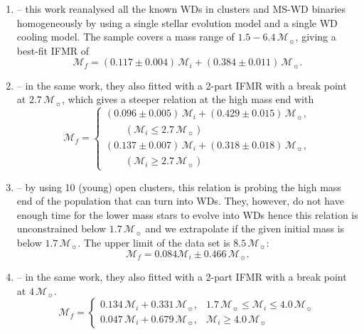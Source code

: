 \documentclass[fleqn,usenatbib]{rasti}
\newcommand{\msun}{\mathcal{M}_{\sun}}
\begin{document}
\begin{enumerate}
    \item \citet{2008MNRAS.387.1693C} -- this work reanalysed all the known WDs in clusters and MS-WD binaries homogeneously by using a single stellar evolution model and a single WD cooling model. The sample covers a mass range of $1.5-6.4\,\msun$, giving a best-fit IFMR of
    \begin{equation}
        \mathcal{M}_f = (0.117 \pm 0.004)\,\mathcal{M}_i + (0.384 \pm 0.011)\,\msun.
    \end{equation}
    \item \citet[][two-part]{2008MNRAS.387.1693C} -- in the same work, they also fitted with a 2-part IFMR with a break point at $2.7\,\msun$, which gives a steeper relation at the high mass end with
    \begin{equation}
        \mathcal{M}_f = \begin{cases}
                  (0.096 \pm 0.005)\,\mathcal{M}_i + (0.429 \pm 0.015)\,\msun,\\
                  \qquad(\mathcal{M}_i \leq 2.7\,\msun)\\
                  (0.137 \pm 0.007)\,\mathcal{M}_i + (0.318 \pm 0.018)\,\msun,\\
                  \qquad(\mathcal{M}_i \geq 2.7\,\msun)
              \end{cases}
    \end{equation}
    \item \citet{2009ApJ...692.1013S} -- by using 10 (young) open clusters, this relation is probing the high mass end of the population that can turn into WDs. They, however, do not have enough time for the lower mass stars to evolve into WDs hence this relation is unconstrained below $1.7\,\msun$ and we extrapolate if the given initial mass is below $1.7\,\msun$. The upper limit of the data set is $8.5\,\msun$:
    \begin{equation}
        \mathcal{M}_f = 0.084 \mathcal{M}_i \pm 0.466\,\msun.
    \end{equation}
    \item \citet[][two-part]{2009ApJ...692.1013S} -- in the same work, they also fitted with a 2-part IFMR with a break point at $4\,\msun$.
    \begin{equation}
        \mathcal{M}_f = \begin{cases}
                  0.134\,\mathcal{M}_i + 0.331\,\msun, &1.7\,\msun \leq \mathcal{M}_i \leq 4.0\,\msun\\
                  0.047\,\mathcal{M}_i + 0.679\,\msun, &\mathcal{M}_i \geq 4.0\,\msun

\end{cases}
\end{equation}
\end{enumerate}
\end{document}

